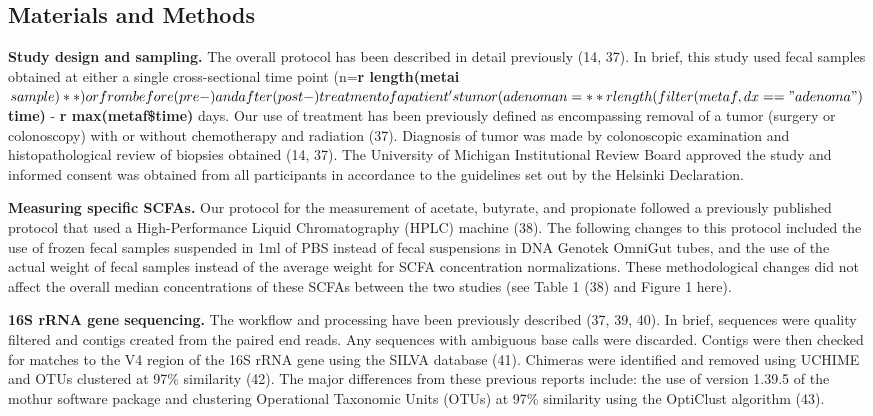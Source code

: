 \documentclass[11pt,]{article}
\begin{document}
\newpage

\hypertarget{materials-and-methods}{%
\subsection{Materials and Methods}\label{materials-and-methods}}

\textbf{Study design and sampling.} The overall protocol has been
described in detail previously (14, 37). In brief, this study used fecal
samples obtained at either a single cross-sectional time point
(n=\textbf{r
length(metai\(sample)**) or from before (pre-) and after (post-) treatment of a patient's tumor (adenoma n =**r length(filter(metaf, dx == "adenoma") %
\)time)} - \textbf{r max(metaf\$time)} days. Our use of treatment has
been previously defined as encompassing removal of a tumor (surgery or
colonoscopy) with or without chemotherapy and radiation (37). Diagnosis
of tumor was made by colonoscopic examination and histopathological
review of biopsies obtained (14, 37). The University of Michigan
Institutional Review Board approved the study and informed consent was
obtained from all participants in accordance to the guidelines set out
by the Helsinki Declaration.

\textbf{Measuring specific SCFAs.} Our protocol for the measurement of
acetate, butyrate, and propionate followed a previously published
protocol that used a High-Performance Liquid Chromatography (HPLC)
machine (38). The following changes to this protocol included the use of
frozen fecal samples suspended in 1ml of PBS instead of fecal
suspensions in DNA Genotek OmniGut tubes, and the use of the actual
weight of fecal samples instead of the average weight for SCFA
concentration normalizations. These methodological changes did not
affect the overall median concentrations of these SCFAs between the two
studies (see Table 1 (38) and Figure 1 here).

\textbf{16S rRNA gene sequencing.} The workflow and processing have been
previously described (37, 39, 40). In brief, sequences were quality
filtered and contigs created from the paired end reads. Any sequences
with ambiguous base calls were discarded. Contigs were then checked for
matches to the V4 region of the 16S rRNA gene using the SILVA database
(41). Chimeras were identified and removed using UCHIME and OTUs
clustered at 97\% similarity (42). The major differences from these
previous reports include: the use of version 1.39.5 of the mothur
software package and clustering Operational Taxonomic Units (OTUs) at
97\% similarity using the OptiClust algorithm (43).
\end{document}
